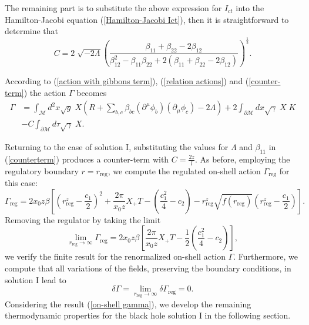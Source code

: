 \documentclass[sn-mathphys,Numbered]{sn-jnl}%
\theoremstyle{thmstyleone}%
\theoremstyle{thmstyletwo}%
\theoremstyle{thmstylethree}%
\begin{document}
The remaining part is to substitute the above expression for $I_{ct}$ into the Hamilton-Jacobi equation (\ref{Hamilton-Jacobi Ict}), then it is straightforward to determine that
%
\begin{equation} \label{counterterm}
    C= 2 \;\sqrt{-2 \Lambda} \left( \frac{\beta_{11}+\beta_{22}-2\beta_{12}}{\beta_{12}^2-\beta_{11}\beta_{22}+2\left(\beta_{11}+\beta_{22}-2\beta_{12}\right)}\right)^{\frac{1}{2}}.
\end{equation}

According to (\ref{action with gibbons term}), (\ref{relation actions}) and (\ref{counter-term}) the action $\Gamma$ becomes
%
\begin{equation}\label{action2}
\begin{aligned}
        \Gamma &= \int _{\mathcal{M}} d^{2} x \sqrt{g} \; X \left ( R + \sum_{b,c} \beta_{bc} (\partial^{\mu} \phi_b)(\partial_{\mu} \phi_c) - 2 \Lambda \right )
        +2\int_{\partial \mathcal{M}} d x \sqrt{\gamma}\; X\; K \\
        &- C\int_{\partial\mathcal{M}} d\tau \sqrt{\gamma}\; X.
\end{aligned}        
\end{equation}

Returning to the case of solution I, substituting the values for $\Lambda$ and $\beta_{11}$ in (\ref{counterterm}) produces a counter-term with $C=\frac{2z}{l}$. As before, employing the regulatory boundary $r=r_{\text{reg}}$, we compute the regulated on-shell action $\Gamma_{\text{reg}}$ for this case:
%
\begin{equation} \label{reg action}
    \Gamma_{\text{reg}}= 2  x_0 z\beta\left[\left(r_{\text{reg}}^z-\frac{c_1}{2}\right)^2+\frac{2\pi}{x_0 z} X_+ T-\left(\frac{c_1^2}{4}-c_2\right)-r_{\text{reg}}^z \sqrt{f(r_{\text{reg}})} \left(r_{\text{reg}}^z-\frac{c_1}{2}\right)\right].
\end{equation}
%
Removing the regulator by taking the limit
%
\begin{equation} \label{on-shell gamma}
    \lim_{r_{\text{reg}}\to\infty} \Gamma_{\text{reg}}=2  x_0 z \beta \left[\frac{2\pi}{x_0 z} X_+ T-\frac{1}{2}\left(\frac{c_1^2}{4}-c_2\right)\right],
\end{equation}
%
we verify the finite result for the renormalized on-shell action $\Gamma$. Furthermore, we compute that all variations of the fields, preserving the boundary conditions, in solution I lead to 
%
\begin{equation}
    \delta \Gamma=\lim_{r_{\text{reg}} \rightarrow \infty} \delta \Gamma_{\text{reg}}=0.
\end{equation}
%
Considering the result (\ref{on-shell gamma}), we develop the remaining thermodynamic properties for the black hole solution I in the following section.
\end{document}

